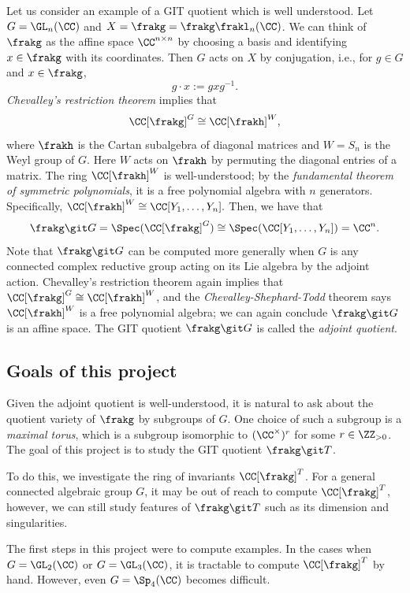 \documentclass[12pt]{amsart}
\theoremstyle{plain}
\begin{document}
Let us consider an example of a GIT quotient which is well understood.
Let $G = \GL_n(\CC)$ and $X = \frakg = \frakg\frakl_n(\CC)$.
We can think of $\frakg$ as the affine space $\CC^{n\times n}$ by choosing a basis and identifying $x \in \frakg$ with its coordinates.
Then $G$ acts on $X$ by conjugation, i.e., for $g \in G$ and $x \in \frakg$,
$$g \cdot x := g x g^{-1}.$$
\emph{Chevalley's restriction theorem} \cite[\S 23]{Humphreys72} implies that 
$$\CC[\frakg]^G \cong \CC[\frakh]^W,$$
where $\frakh$ is the Cartan subalgebra of diagonal matrices and $W = S_n$ is the Weyl group of $G$.
Here $W$ acts on $\frakh$ by permuting the diagonal entries of a matrix.
The ring $\CC[\frakh]^W$ is well-understood;
by the \emph{fundamental theorem of symmetric polynomials}, it is a free polynomial algebra with $n$ generators.
Specifically, $\CC[\frakh]^W \cong \CC[Y_1, \ldots, Y_n].$
Then, we have that
$$\frakg \git G = \Spec(\CC[\frakg]^G) \cong \Spec(\CC[Y_1, \ldots, Y_n]) = \CC^n.$$
Note that $\frakg \git G$ can be computed more generally when $G$ is any connected complex reductive group acting on its Lie algebra by the adjoint action.
Chevalley's restriction theorem again implies that $\CC[\frakg]^G \cong \CC[\frakh]^W$, and the \emph{Chevalley-Shephard-Todd} theorem \cite[\S 3]{Humphreys90} says $\CC[\frakh]^W$ is a free polynomial algebra;
we can again conclude $\frakg\git G$ is an affine space.
The GIT quotient $\frakg \git G$ is called the \emph{adjoint quotient}.

\subsection{Goals of this project}
Given the adjoint quotient is well-understood, it is natural to ask about the quotient variety of $\frakg$ by subgroups of $G$.
One choice of such a subgroup is a \emph{maximal torus}, which is a subgroup isomorphic to $(\CC^\times)^r$ for some $r \in \ZZ_{> 0}$.
The goal of this project is to study the GIT quotient $\frakg \git T$.

To do this, we investigate the ring of invariants $\CC[\frakg]^T$.
For a general connected algebraic group $G$, it may be out of reach to compute $\CC[\frakg]^T$, however, we can still study features of $\frakg \git T$ such as its dimension and singularities.

The first steps in this project were to compute examples.
In the cases when $G = \GL_2(\CC)$ or $G = \GL_3(\CC)$, it is tractable to compute $\CC[\frakg]^T$ by hand.
However, even $G = \Sp_4(\CC)$ becomes difficult.
\end{document}
